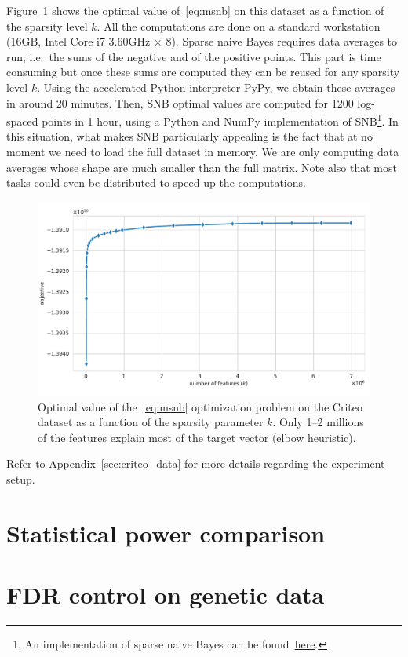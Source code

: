Figure~\ref{fig:criteo_hash_elbow} shows the optimal value of~\ref{eq:msnb} on this dataset as a function
of the sparsity level $k$.
All the computations are done on a standard workstation (16GB, Intel Core i7 3.60GHz $\times$ 8).
Sparse naive Bayes requires data averages to run,
i.e.\ the sums of the negative and of the positive points.
This part is time consuming but once these sums are computed they can be reused for any sparsity level $k$.
Using the accelerated Python interpreter PyPy, we obtain these averages in around 20 minutes.
Then, SNB optimal values are computed for 1200 log-spaced points in 1 hour,
using a Python and NumPy implementation of SNB\footnote{
    An implementation of sparse naive Bayes can be found~\href{https://github.com/aspremon/NaiveFeatureSelection}{here}.
}.
In this situation, what makes SNB particularly appealing is the fact that at no moment we need to load the full dataset
in memory.
We are only computing data averages whose shape are much smaller than the full matrix.
Note also that most tasks could even be distributed to speed up the computations.
\begin{figure}
    \centering
    \includegraphics[width=0.75\linewidth, height=0.4\linewidth]{figures/criteo_hash_elbow.pdf}
    \caption{
        Optimal value of the~\ref{eq:msnb} optimization problem on the Criteo dataset
        as a function of the sparsity parameter $k$.
        Only 1--2 millions of the features explain most of the target vector (elbow heuristic).
    }
    \label{fig:criteo_hash_elbow}
\end{figure}
Refer to Appendix~\ref{sec:criteo_data} for more details regarding the experiment setup.

\section{Statistical power comparison}\label{sec:power_comparison}

\section{FDR control on genetic data}\label{sec:genetic_data}

